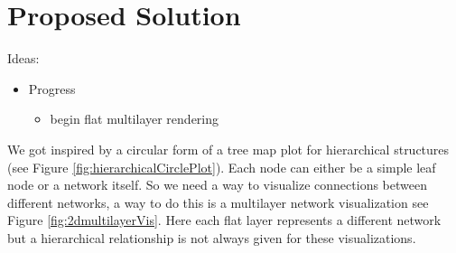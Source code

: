 \chapter{Proposed Solution}
Ideas:
\begin{itemize}
    \item Progress
        \begin{itemize}
            \item begin flat multilayer rendering
        \end{itemize}
\end{itemize}

We got inspired by a circular form of a tree map plot for hierarchical structures (see Figure \ref{fig:hierarchicalCirclePlot}). Each node can either be a simple leaf node or a network itself. So we need a way to visualize connections between different networks, a way to do this is a multilayer network visualization see Figure \ref{fig:2dmultilayerVis}. Here each flat layer represents a different network but a hierarchical relationship is not always given for these visualizations.  

